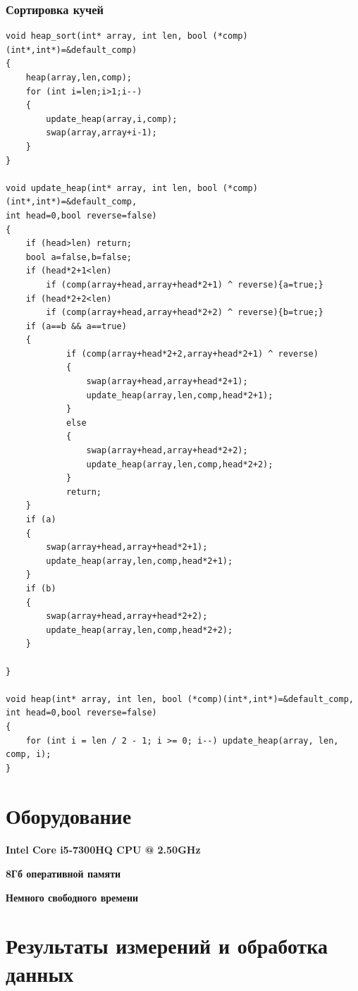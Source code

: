\documentclass[12pt,a4paper]{article}
\begin{document}
\newpage
\subsubsection{ Сортировка кучей}
\begin{verbatim}
void heap_sort(int* array, int len, bool (*comp)(int*,int*)=&default_comp)
{
    heap(array,len,comp);    
    for (int i=len;i>1;i--)
    {
        update_heap(array,i,comp);
        swap(array,array+i-1);
    }
}

void update_heap(int* array, int len, bool (*comp)(int*,int*)=&default_comp, 
int head=0,bool reverse=false)
{
    if (head>len) return;
    bool a=false,b=false;
    if (head*2+1<len)
        if (comp(array+head,array+head*2+1) ^ reverse){a=true;}
    if (head*2+2<len)
        if (comp(array+head,array+head*2+2) ^ reverse){b=true;}
    if (a==b && a==true)
    {
            if (comp(array+head*2+2,array+head*2+1) ^ reverse)
            {
                swap(array+head,array+head*2+1);
                update_heap(array,len,comp,head*2+1);
            }
            else
            {
                swap(array+head,array+head*2+2);
                update_heap(array,len,comp,head*2+2);
            }
            return;
    }
    if (a)
    {
        swap(array+head,array+head*2+1);
        update_heap(array,len,comp,head*2+1);
    }
    if (b)
    {
        swap(array+head,array+head*2+2);
        update_heap(array,len,comp,head*2+2);
    }
    
}

void heap(int* array, int len, bool (*comp)(int*,int*)=&default_comp,
int head=0,bool reverse=false)
{
    for (int i = len / 2 - 1; i >= 0; i--) update_heap(array, len, comp, i);
}
\end{verbatim}

\newpage
\section{ Оборудование}
{\bfseries Intel Core i5-7300HQ CPU @ 2.50GHz}

{\bfseries 8Гб оперативной памяти}

{\bfseries Немного свободного времени}

\section{ Результаты измерений и обработка данных}
\end{document}
